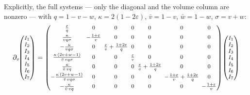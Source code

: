 \documentclass[11pt]{article}
\newcommand{\eps}{\varepsilon}
\begin{document}
Explicitly, the full systems --- only the diagonal and the volume
column are nonzero --- with $q = 1-v-w$, $\kappa = 2(1-2\eps)$,
$\bar v = 1-v$, $\bar w = 1-w$, $\sigma = v+w$:
\begin{equation}
\partial_v\!
{\footnotesize \begin{pmatrix} I_1 \\ I_2 \\ I_3 \\ I_4 \\ I_5 \\ I_6 \\ I_7 \end{pmatrix}}
=
{\footnotesize
\setlength{\arraycolsep}{2pt}
\begin{pmatrix}
\frac{\eps}{q} & 0 & 0 & 0 & 0 & 0 & 0 \\[1.1ex]
\frac{\kappa}{v q \sigma} & -\frac{1+\eps}{v} & 0 & 0 & 0 & 0 & 0 \\[1.1ex]
-\frac{\kappa}{v q \sigma} & 0 &
  \frac{\eps}{v}+\frac{1+2\eps}{q} & 0 & 0 & 0 & 0 \\[1.1ex]
\frac{\kappa\,(2v+w-1)}{\bar v\, v q \sigma} & 0 & 0 &
  \frac{\eps}{v} & 0 & 0 & 0 \\[1.1ex]
\frac{\kappa}{\bar v\, v q} & 0 & 0 & 0 &
  \frac{\eps}{v}+\frac{1+2\eps}{q} & 0 & 0 \\[1.1ex]
-\frac{\kappa\,(2v+w-1)}{\bar v\, v q \sigma} & 0 & 0 & 0 & 0 &
  -\frac{1+\eps}{v}+\frac{1+2\eps}{q} & 0 \\[1.1ex]
-\frac{\kappa}{\bar v\, v q} & 0 & 0 & 0 & 0 & 0 &
  -\frac{1+\eps}{v}
\end{pmatrix}
}
{\footnotesize \begin{pmatrix} I_1 \\ I_2 \\ I_3 \\ I_4 \\ I_5 \\ I_6 \\ I_7 \end{pmatrix}}
\label{eq:Av}
\end{equation}
\end{document}
